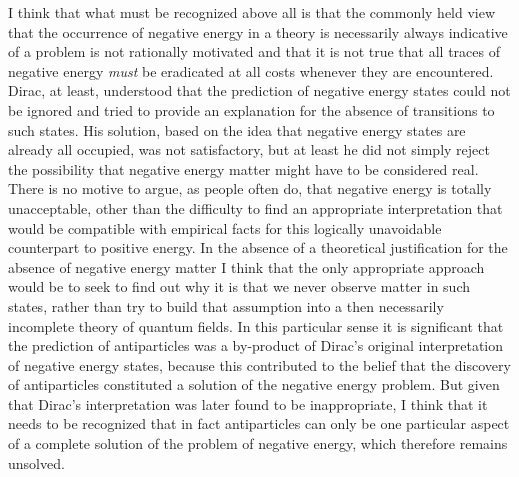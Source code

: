 \documentclass[notitlepage,12pt]{report}
\begin{document}
\bigskip

\noindent I think that what must be recognized above all is that the commonly held view that the occurrence of negative energy in a theory is necessarily always indicative of a problem is not rationally motivated and that it is not true that all traces of negative energy \textit{must} be eradicated at all costs whenever they are encountered. Dirac, at least, understood that the prediction of negative energy states could not be ignored and tried to provide an explanation for the absence of transitions to such states. His solution, based on the idea that negative energy states are already all occupied, was not satisfactory, but at least he did not simply reject the possibility that negative energy matter might have to be considered real. There is no motive to argue, as people often do, that negative energy is totally unacceptable, other than the difficulty to find an appropriate interpretation that would be compatible with empirical facts for this logically unavoidable counterpart to positive energy. In the absence of a theoretical justification for the absence of negative energy matter I think that the only appropriate approach would be to seek to find out why it is that we never observe matter in such states, rather than try to build that assumption into a then necessarily incomplete theory of quantum fields. In this particular sense it is significant that the prediction of antiparticles was a by-product of Dirac's original interpretation of negative energy states, because this contributed to the belief that the discovery of antiparticles constituted a solution of the negative energy problem. But given that Dirac's interpretation was later found to be inappropriate, I think that it needs to be recognized that in fact antiparticles can only be one particular aspect of a complete solution of the problem of negative energy, which therefore remains unsolved.
\end{document}
